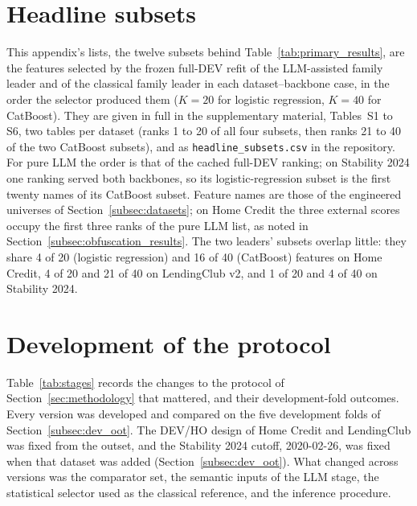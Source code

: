 \documentclass[final,5p,twocolumn]{elsarticle}
\newcommand{\Kfeat}{K}
\begin{document}
\section{Headline subsets}
\label{app:subsets}
\setcounter{table}{0}\setcounter{figure}{0}

This appendix's lists, the twelve subsets behind Table~\ref{tab:primary_results}, are the features selected by the frozen full-DEV refit of the LLM-assisted family leader and of the classical family leader in each dataset--backbone case, in the order the selector produced them ($\Kfeat=20$ for logistic regression, $\Kfeat=40$ for CatBoost). They are given in full in the supplementary material, Tables~S1 to S6, two tables per dataset (ranks 1 to 20 of all four subsets, then ranks 21 to 40 of the two CatBoost subsets), and as \texttt{headline\_subsets.csv} in the repository. For pure LLM the order is that of the cached full-DEV ranking; on Stability 2024 one ranking served both backbones, so its logistic-regression subset is the first twenty names of its CatBoost subset. Feature names are those of the engineered universes of Section~\ref{subsec:datasets}; on Home Credit the three external scores occupy the first three ranks of the pure LLM list, as noted in Section~\ref{subsec:obfuscation_results}. The two leaders' subsets overlap little: they share 4 of 20 (logistic regression) and 16 of 40 (CatBoost) features on Home Credit, 4 of 20 and 21 of 40 on LendingClub v2, and 1 of 20 and 4 of 40 on Stability 2024.

\section{Development of the protocol}
\label{app:protocol}
\setcounter{table}{0}\setcounter{figure}{0}

Table~\ref{tab:stages} records the changes to the protocol of Section~\ref{sec:methodology} that mattered, and their development-fold outcomes. Every version was developed and compared on the five development folds of Section~\ref{subsec:dev_oot}. The DEV/HO design of Home Credit and LendingClub was fixed from the outset, and the Stability 2024 cutoff, 2020-02-26, was fixed when that dataset was added (Section~\ref{subsec:dev_oot}). What changed across versions was the comparator set, the semantic inputs of the LLM stage, the statistical selector used as the classical reference, and the inference procedure.
\end{document}
